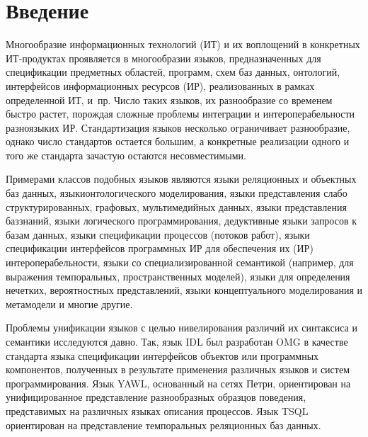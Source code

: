   

      \thispagestyle{headings}

      \begin{multicols}{2}

            \label{st\stat}

\section{Введение}

Многообразие информационных технологий (ИТ) и их воплощений в конкретных 
ИТ-продуктах проявляется в многообразии языков, предназначенных для спецификации 
предметных областей, программ, схем баз данных, онтологий, интерфейсов 
информационных ресурсов (ИР), реализованных в рамках определенной ИТ, и~пр. Число 
таких языков, их разнообразие со временем быстро рас\-тет, порождая сложные проблемы 
интеграции и интероперабельности разноязыких ИР. Стандартизация языков несколько 
ограничивает разнообразие, однако число стандартов остается большим, а конкретные 
реализации одного и того же стандарта зачастую остаются несовместимыми.

Примерами классов подобных языков являются языки реляционных и объектных баз 
данных, языки\linebreak онтологического моделирования, языки пред\-став\-ле\-ния слабо 
структурированных, графовых, мультимедийных данных, языки представления баз\linebreak знаний, 
языки логического программирования, дедуктивные языки запросов к базам данных, языки 
спецификации процессов (потоков работ), языки спецификации интерфейсов программных 
ИР для обеспечения их (ИР) интероперабельности, языки со специализированной 
семантикой (например, для выражения темпоральных, пространственных моделей), языки 
для определения нечетких, вероятностных представлений, языки концептуального 
моделирования и метамодели и многие другие.

Проблемы унификации языков с целью нивелирования различий их синтаксиса и 
семантики исследуются давно. Так, язык IDL был разработан OMG в качестве стандарта 
языка спецификации интерфейсов объектов или программных компонентов, полученных в 
результате применения различных языков и систем программирования. Язык YAWL, 
основанный на сетях Петри, ориентирован на унифицированное представление 
разнообразных образцов поведения, представимых на различных языках описания 
процессов. Язык TSQL ориентирован на представление темпоральных реляционных баз 
данных.


\end{multicols}
